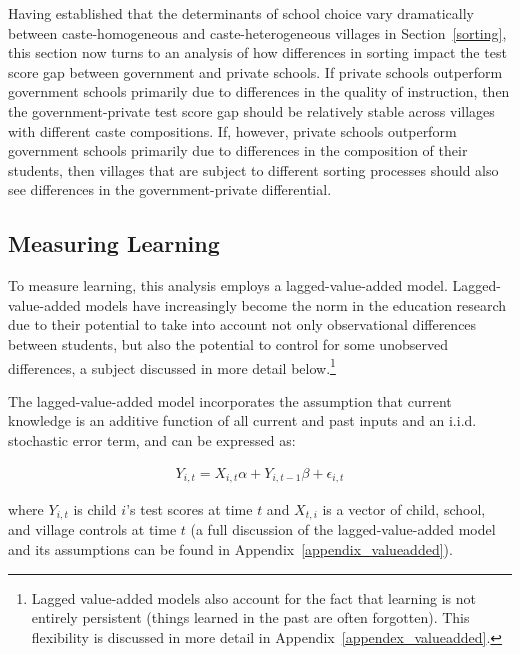 \documentclass[Eubank_pk_ethnic_sorting.tex]{subfiles}
\begin{document}
Having established that the determinants of school choice vary dramatically between caste-homogeneous and caste-heterogeneous villages in Section~\ref{sorting}, this section now turns to an analysis of how differences in sorting impact the test score gap between government and private schools. If private schools outperform government schools primarily due to differences in the quality of instruction, then the government-private test score gap should be relatively stable across villages with different caste compositions. If, however, private schools outperform government schools primarily due to differences in the composition of their students, then villages that are subject to different sorting processes should also see differences in the government-private differential.

\subsection{Measuring Learning}\label{}

To measure learning, this analysis employs a lagged-value-added model. Lagged-value-added models have increasingly become the norm in the education research \citep{Gordon:2006wt,McCaffrey:2003vk,Hanushek:2003hz} due to their potential to take into account not only observational differences between students, but also the potential to control for some unobserved differences, a subject discussed in more detail below.\footnote{Lagged value-added models also account for the fact that learning is not entirely persistent (things learned in the past are often forgotten). This flexibility is discussed in more detail in Appendix~\ref{appendex_valueadded}.} 

The lagged-value-added model incorporates the assumption that current knowledge is an additive function of all current and past inputs and an i.i.d. stochastic error term, and can be expressed as:

\begin{eqnarray}
	Y_{i,t}=X_{i,t}\alpha+Y_{i,t-1}\beta + \epsilon_{i,t}\label{primary}
\end{eqnarray}

where $Y_{i,t}$ is child $i$'s test scores at time $t$ and $X_{t,i}$ is a vector of child, school, and village controls at time $t$ (a full discussion of the lagged-value-added model and its assumptions can be found in Appendix~\ref{appendix_valueadded}). 
\end{document}

